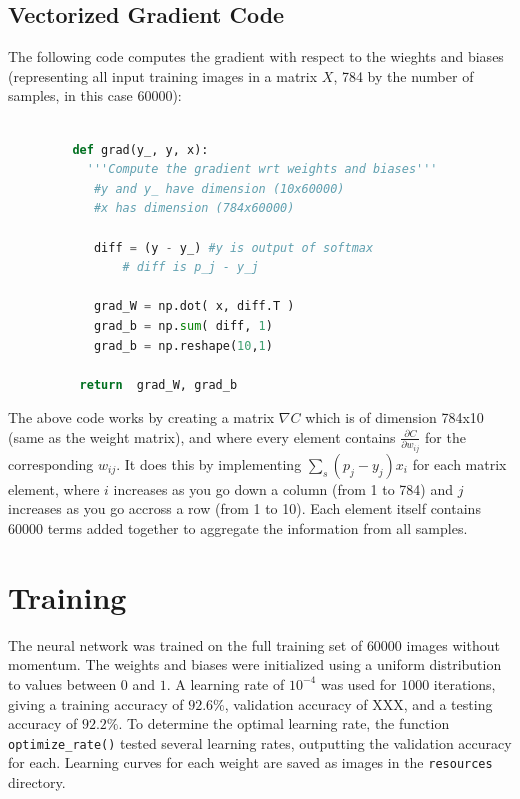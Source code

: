 \documentclass{article}
\begin{document}
   \subsection{Vectorized Gradient Code}
   The following code computes the gradient with respect to the wieghts and biases
   (representing all input training images in a matrix $X$, 784 by the number of samples, in this case 60000):
      \begin{lstlisting}[language=Python]

         def grad(y_, y, x):
      	   '''Compute the gradient wrt weights and biases'''
          	#y and y_ have dimension (10x60000)
          	#x has dimension (784x60000)

          	diff = (y - y_) #y is output of softmax
              	# diff is p_j - y_j

          	grad_W = np.dot( x, diff.T )
          	grad_b = np.sum( diff, 1)
          	grad_b = np.reshape(10,1)

          return  grad_W, grad_b
      \end{lstlisting}

   The above code works by creating a matrix $\nabla C $ which is of dimension 784x10
   (same as the weight matrix), and where every element contains $\frac{ \partial C}{ \partial w_{ij} }$ for the corresponding $w_{ij}$.
   It does this by implementing $\sum_s ( p_j - y_j ) x_i$ for each matrix element, where $i$ increases as you go down
   a column (from 1 to 784) and $j$ increases as you go accross a row (from 1 to 10). Each element itself contains 60000
   terms added together to aggregate the information from all samples.

   \section{Training}
   The neural network was trained on the full training set of $60000$ images without momentum.
   The weights and biases were initialized using a uniform distribution to values between $0$ and $1$.
   A learning rate of $10^{-4}$ was used for $1000$ iterations, giving a training accuracy of $92.6\%$,
   validation accuracy of XXX, and a testing accuracy of $92.2\%$.
   To determine the optimal learning rate, the function \texttt{optimize\_rate()} tested several
   learning rates, outputting the validation accuracy for each. Learning curves for each weight
   are saved as images in the \texttt{resources} directory.
\end{document}
